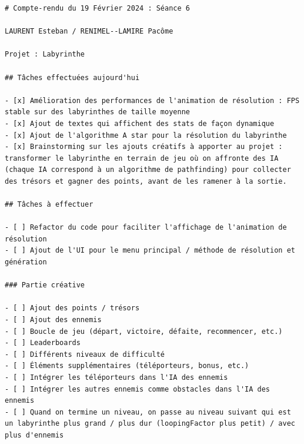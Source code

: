 \documentclass[12pt]{scrreprt} %
\begin{document}
\begin{verbatim}
# Compte-rendu du 19 Février 2024 : Séance 6

LAURENT Esteban / RENIMEL--LAMIRE Pacôme

Projet : Labyrinthe

## Tâches effectuées aujourd'hui

- [x] Amélioration des performances de l'animation de résolution : FPS stable sur des labyrinthes de taille moyenne
- [x] Ajout de textes qui affichent des stats de façon dynamique
- [x] Ajout de l'algorithme A star pour la résolution du labyrinthe
- [x] Brainstorming sur les ajouts créatifs à apporter au projet : transformer le labyrinthe en terrain de jeu où on affronte des IA (chaque IA correspond à un algorithme de pathfinding) pour collecter des trésors et gagner des points, avant de les ramener à la sortie.

## Tâches à effectuer

- [ ] Refactor du code pour faciliter l'affichage de l'animation de résolution
- [ ] Ajout de l'UI pour le menu principal / méthode de résolution et génération

### Partie créative

- [ ] Ajout des points / trésors
- [ ] Ajout des ennemis
- [ ] Boucle de jeu (départ, victoire, défaite, recommencer, etc.)
- [ ] Leaderboards
- [ ] Différents niveaux de difficulté
- [ ] Éléments supplémentaires (téléporteurs, bonus, etc.)
- [ ] Intégrer les téléporteurs dans l'IA des ennemis
- [ ] Intégrer les autres ennemis comme obstacles dans l'IA des ennemis
- [ ] Quand on termine un niveau, on passe au niveau suivant qui est un labyrinthe plus grand / plus dur (loopingFactor plus petit) / avec plus d'ennemis

\end{verbatim}
\end{document}
